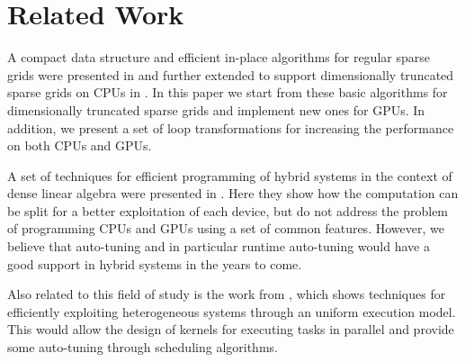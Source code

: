 \section{Related Work}
\label{sec:related_work}
A compact data structure and efficient in-place algorithms for regular sparse
grids were presented in \cite{Murarasu:2011:CDS:1941553.1941559} and further
extended to support dimensionally truncated sparse grids on CPUs in
\cite{murarasu12fastsg:}. In this paper we start from these basic algorithms for
dimensionally truncated sparse grids and implement new ones for GPUs. In
addition, we present a set of loop transformations for increasing the
performance on both CPUs and GPUs.

A set of techniques for efficient programming of hybrid systems in the context
of dense linear algebra were presented in \cite{Tomov:2010:TDL:1805333.1805388}.
Here they show how the computation can be split for a better exploitation of
each device, but do not address the problem of programming CPUs and GPUs using a
set of common features. However, we believe that auto-tuning and in particular
runtime auto-tuning would have a good support in hybrid systems in the years to
come.

Also related to this field of study is the work from
\cite{Augonnet:2011:SUP:1951453.1951454}, which shows techniques for efficiently
exploiting heterogeneous systems through an uniform execution model. This would
allow the design of kernels for executing tasks in parallel and provide some
auto-tuning through scheduling algorithms.

